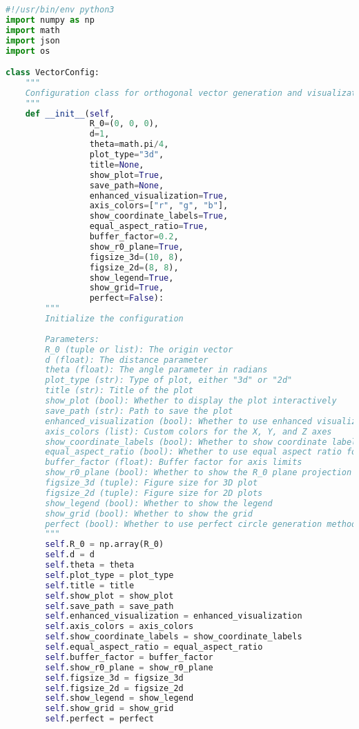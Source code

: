 \begin{lstlisting}[language=Python]
#!/usr/bin/env python3
import numpy as np
import math
import json
import os

class VectorConfig:
    """
    Configuration class for orthogonal vector generation and visualization
    """
    def __init__(self, 
                 R_0=(0, 0, 0), 
                 d=1, 
                 theta=math.pi/4,
                 plot_type="3d",
                 title=None,
                 show_plot=True,
                 save_path=None,
                 enhanced_visualization=True,
                 axis_colors=["r", "g", "b"],
                 show_coordinate_labels=True,
                 equal_aspect_ratio=True,
                 buffer_factor=0.2,
                 show_r0_plane=True,
                 figsize_3d=(10, 8),
                 figsize_2d=(8, 8),
                 show_legend=True,
                 show_grid=True,
                 perfect=False):
        """
        Initialize the configuration
        
        Parameters:
        R_0 (tuple or list): The origin vector
        d (float): The distance parameter
        theta (float): The angle parameter in radians
        plot_type (str): Type of plot, either "3d" or "2d"
        title (str): Title of the plot
        show_plot (bool): Whether to display the plot interactively
        save_path (str): Path to save the plot
        enhanced_visualization (bool): Whether to use enhanced visualization features
        axis_colors (list): Custom colors for the X, Y, and Z axes
        show_coordinate_labels (bool): Whether to show coordinate labels on the axes
        equal_aspect_ratio (bool): Whether to use equal aspect ratio for 3D plots
        buffer_factor (float): Buffer factor for axis limits
        show_r0_plane (bool): Whether to show the R_0 plane projection
        figsize_3d (tuple): Figure size for 3D plot
        figsize_2d (tuple): Figure size for 2D plots
        show_legend (bool): Whether to show the legend
        show_grid (bool): Whether to show the grid
        perfect (bool): Whether to use perfect circle generation method
        """
        self.R_0 = np.array(R_0)
        self.d = d
        self.theta = theta
        self.plot_type = plot_type
        self.title = title
        self.show_plot = show_plot
        self.save_path = save_path
        self.enhanced_visualization = enhanced_visualization
        self.axis_colors = axis_colors
        self.show_coordinate_labels = show_coordinate_labels
        self.equal_aspect_ratio = equal_aspect_ratio
        self.buffer_factor = buffer_factor
        self.show_r0_plane = show_r0_plane
        self.figsize_3d = figsize_3d
        self.figsize_2d = figsize_2d
        self.show_legend = show_legend
        self.show_grid = show_grid
        self.perfect = perfect
    

\end{lstlisting}
